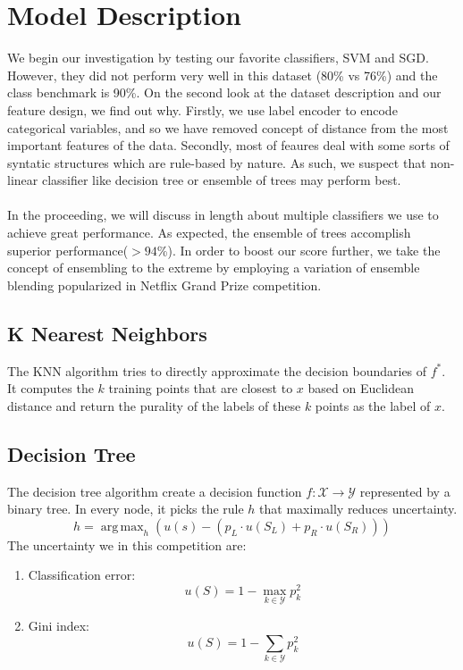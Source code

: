 \documentclass[conference]{IEEEtran}
\DeclareMathOperator*{\argmax}{arg\,max}
\begin{document}
\newcommand{\vh}{\mathbf{h}}

\section{Model Description}
We begin our investigation by testing our favorite classifiers, SVM and SGD. However, they did not perform very well in this dataset (80\% vs 76\%) and the class benchmark is 90\%. On the second look at the dataset description and our feature design, we find out why. Firstly, we use label encoder to encode categorical variables, and so we have removed concept of distance from the most important features of the data. Secondly, most of feaures deal with some sorts of syntatic structures which are rule-based by nature. As such, we suspect that non-linear classifier like decision tree or ensemble of trees may perform best. \\ \\
In the proceeding, we will discuss in length about multiple classifiers we use to achieve great performance. As expected, the ensemble of trees accomplish superior performance($> 94$\%). In order to boost our score further, we take the concept of ensembling to the extreme by employing a variation of ensemble blending popularized in Netflix Grand Prize competition.

\subsection{K Nearest Neighbors}
The KNN algorithm tries to directly approximate the decision boundaries of $f^*$. It computes the $k$ training points that are closest to $x$ based on Euclidean distance and return the purality of the labels of these $k$ points as the label of $x$.

\subsection{Decision Tree}
The decision tree algorithm create a decision function \(f: \mathcal{X}\rightarrow\mathcal{Y}\) represented by a binary tree. In every node, it picks the rule $h$ that maximally reduces uncertainty.
\begin{equation}
h = \argmax_h (u(s)-(p_L \cdot u(S_L) + p_R \cdot u(S_R)))
\end{equation} 
The uncertainty we in this competition are:
\begin{enumerate}
\item Classification error:
\begin{equation}
u(S)=1-\max_{k \in \mathcal{Y}} p_k^2
\end{equation} 
\item Gini index:
\begin{equation}
u(S)=1-\sum_{k \in \mathcal{Y}} p_k^2
\end{equation} 
\end{enumerate}
\end{document}
